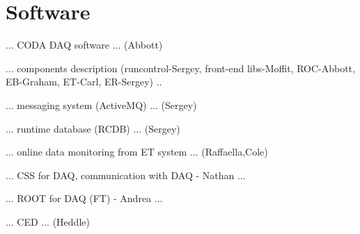 \section{Software}

... CODA DAQ software ... (Abbott)

... components description (runcontrol-Sergey, front-end libs-Moffit, ROC-Abbott, EB-Graham, ET-Carl, ER-Sergey) ..

... messaging system (ActiveMQ) ... (Sergey)

... runtime database (RCDB) ... (Sergey)

... online data monitoring from ET system ... (Raffaella,Cole)

... CSS for DAQ, communication with DAQ - Nathan ...

... ROOT for DAQ (FT) - Andrea ... 

... CED ... (Heddle)